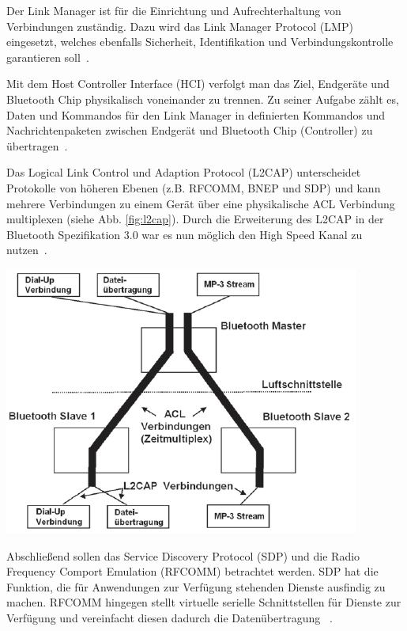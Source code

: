 \begin{multicols}{3}

Der Link Manager ist für die Einrichtung und Aufrechterhaltung von Verbindungen zuständig. Dazu wird das Link Manager Protocol (LMP) eingesetzt, welches ebenfalls Sicherheit, Identifikation und Verbindungskontrolle garantieren soll~\cite{bluetooth3.0.3}.

Mit dem Host Controller Interface (HCI) verfolgt man das Ziel, Endgeräte und Bluetooth Chip physikalisch voneinander zu trennen. Zu seiner Aufgabe zählt es, Daten und Kommandos für den Link Manager in definierten Kommandos und Nachrichtenpaketen zwischen Endgerät und Bluetooth Chip (Controller) zu übertragen~\cite{bluetooth3.0.1}.

Das Logical Link Control und Adaption Protocol (L2CAP) unterscheidet Protokolle von höheren Ebenen (z.B. RFCOMM, BNEP und SDP) und kann mehrere Verbindungen zu einem Gerät über eine physikalische ACL Verbindung multiplexen (siehe Abb. \ref{fig:l2cap}). Durch die Erweiterung des L2CAP in der Bluetooth Spezifikation 3.0 war es nun möglich den High Speed Kanal zu nutzen~\cite{bluetooth3.0.1}.

\begin{Figure}
\includegraphics[width=\linewidth]{Kapitel/Bluetooth3.0/Grafiken/l2cap.png}
\label{fig:l2cap}
\end{Figure} 

\noindent
Abschließend sollen das Service Discovery Protocol (SDP) und die Radio Frequency Comport Emulation (RFCOMM) betrachtet werden. SDP hat die Funktion, die für Anwendungen zur Verfügung stehenden Dienste ausfindig zu machen. RFCOMM hingegen stellt virtuelle serielle Schnittstellen für Dienste zur Verfügung und vereinfacht diesen dadurch die Datenübertragung ~\cite{bluetooth3.0.3}.


\end{multicols}
